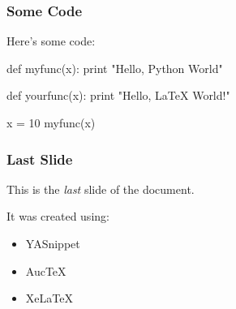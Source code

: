 \documentclass[svgnames]{beamer}
\begin{document}
\begin{frame}[fragile]
\frametitle{Some Code}

Here's some code:

\begin{python}
def myfunc(x):
    print "Hello, Python World"

def yourfunc(x):
    print "Hello, LaTeX World!"

x = 10
myfunc(x)

\end{python}


\end{frame}


\begin{frame}[fragile]
  \frametitle{Last Slide}

  This is the \emph{last} slide of the document.

It was created using:
  \begin{itemize}
  \item YASnippet
  \item AucTeX 
  \item XeLaTeX
  \end{itemize}

\end{frame}




\end{document}
